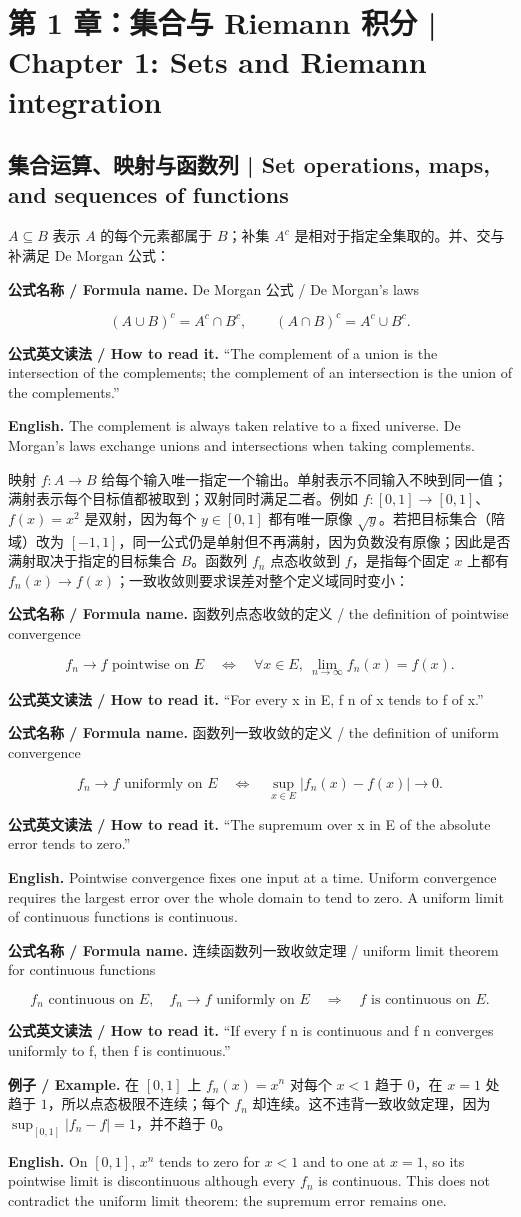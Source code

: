 \documentclass[UTF8,11pt,a4paper]{ctexart}
\newcommand{\EN}[1]{\par\noindent\textbf{English.} #1\par}
\newcommand{\READ}[1]{\par\noindent\textbf{公式英文读法 / How to read it.} #1\par}
\let\APSsubsection\subsection
\renewcommand{\subsection}[1]{\Needspace{6\baselineskip}\APSsubsection{#1}}
\newcommand{\chaptersection}[1]{\Needspace{10\baselineskip}\refstepcounter{section}\section*{#1}}
\newcommand{\FORMULA}[2]{\par\Needspace{3\baselineskip}\noindent\textbf{公式名称 / Formula name.} #1 / #2\par}
\newcommand{\EX}[2]{\par\noindent\textbf{例子 / Example.} #1\par\EN{#2}}
\begin{document}
\chaptersection{第 1 章：集合与 Riemann 积分 | Chapter 1: Sets and Riemann integration}
\subsection{集合运算、映射与函数列 | Set operations, maps, and sequences of functions}
\noindent $A\subseteq B$ 表示 $A$ 的每个元素都属于 $B$；补集 $A^c$ 是相对于指定全集取的。并、交与补满足 De Morgan 公式：
\FORMULA{De Morgan 公式}{De Morgan's laws}
\[
(A\cup B)^c=A^c\cap B^c,
\qquad
(A\cap B)^c=A^c\cup B^c.
\]
\READ{“The complement of a union is the intersection of the complements; the complement of an intersection is the union of the complements.”}
\EN{The complement is always taken relative to a fixed universe. De Morgan's laws exchange unions and intersections when taking complements.}
\noindent 映射 $f:A\to B$ 给每个输入唯一指定一个输出。单射表示不同输入不映到同一值；满射表示每个目标值都被取到；双射同时满足二者。例如 $f:[0,1]\to[0,1]$、$f(x)=x^2$ 是双射，因为每个 $y\in[0,1]$ 都有唯一原像 $\sqrt y$。若把目标集合（陪域）改为 $[-1,1]$，同一公式仍是单射但不再满射，因为负数没有原像；因此是否满射取决于指定的目标集合 $B$。函数列 $f_n$ 点态收敛到 $f$，是指每个固定 $x$ 上都有 $f_n(x)\to f(x)$；一致收敛则要求误差对整个定义域同时变小：
\FORMULA{函数列点态收敛的定义}{the definition of pointwise convergence}
\[
f_n\to f\text{ pointwise on }E
\quad\Longleftrightarrow\quad
\forall x\in E,\ \lim_{n\to\infty}f_n(x)=f(x).
\]
\READ{“For every x in E, f n of x tends to f of x.”}
\FORMULA{函数列一致收敛的定义}{the definition of uniform convergence}
\[
f_n\to f\text{ uniformly on }E
\quad\Longleftrightarrow\quad
\sup_{x\in E}|f_n(x)-f(x)|\longrightarrow0.
\]
\READ{“The supremum over x in E of the absolute error tends to zero.”}
\EN{Pointwise convergence fixes one input at a time. Uniform convergence requires the largest error over the whole domain to tend to zero. A uniform limit of continuous functions is continuous.}
\FORMULA{连续函数列一致收敛定理}{uniform limit theorem for continuous functions}
\[
f_n\text{ continuous on }E,\quad f_n\to f\text{ uniformly on }E
\quad\Longrightarrow\quad f\text{ is continuous on }E.
\]
\READ{“If every f n is continuous and f n converges uniformly to f, then f is continuous.”}
\EX{在 $[0,1]$ 上 $f_n(x)=x^n$ 对每个 $x<1$ 趋于 $0$，在 $x=1$ 处趋于 $1$，所以点态极限不连续；每个 $f_n$ 却连续。这不违背一致收敛定理，因为 $\sup_{[0,1]}|f_n-f|=1$，并不趋于 $0$。}{On $[0,1]$, $x^n$ tends to zero for $x<1$ and to one at $x=1$, so its pointwise limit is discontinuous although every $f_n$ is continuous. This does not contradict the uniform limit theorem: the supremum error remains one.}
\end{document}
